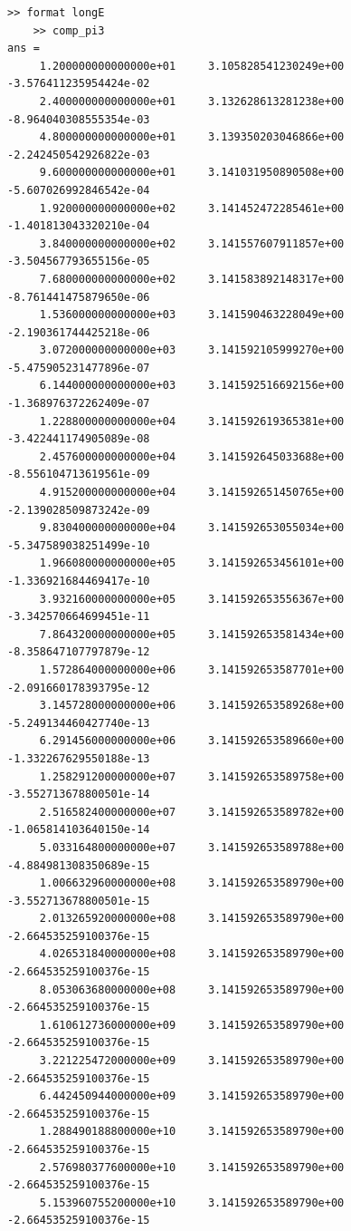 \documentclass[uplatex, dvipdfmx]{jsarticle}
\begin{document}
\begin{lstlisting}[caption=出力]
    >> format longE
    >> comp_pi3
ans =
     1.200000000000000e+01     3.105828541230249e+00    -3.576411235954424e-02
     2.400000000000000e+01     3.132628613281238e+00    -8.964040308555354e-03
     4.800000000000000e+01     3.139350203046866e+00    -2.242450542926822e-03
     9.600000000000000e+01     3.141031950890508e+00    -5.607026992846542e-04
     1.920000000000000e+02     3.141452472285461e+00    -1.401813043320210e-04
     3.840000000000000e+02     3.141557607911857e+00    -3.504567793655156e-05
     7.680000000000000e+02     3.141583892148317e+00    -8.761441475879650e-06
     1.536000000000000e+03     3.141590463228049e+00    -2.190361744425218e-06
     3.072000000000000e+03     3.141592105999270e+00    -5.475905231477896e-07
     6.144000000000000e+03     3.141592516692156e+00    -1.368976372262409e-07
     1.228800000000000e+04     3.141592619365381e+00    -3.422441174905089e-08
     2.457600000000000e+04     3.141592645033688e+00    -8.556104713619561e-09
     4.915200000000000e+04     3.141592651450765e+00    -2.139028509873242e-09
     9.830400000000000e+04     3.141592653055034e+00    -5.347589038251499e-10
     1.966080000000000e+05     3.141592653456101e+00    -1.336921684469417e-10
     3.932160000000000e+05     3.141592653556367e+00    -3.342570664699451e-11
     7.864320000000000e+05     3.141592653581434e+00    -8.358647107797879e-12
     1.572864000000000e+06     3.141592653587701e+00    -2.091660178393795e-12
     3.145728000000000e+06     3.141592653589268e+00    -5.249134460427740e-13
     6.291456000000000e+06     3.141592653589660e+00    -1.332267629550188e-13
     1.258291200000000e+07     3.141592653589758e+00    -3.552713678800501e-14
     2.516582400000000e+07     3.141592653589782e+00    -1.065814103640150e-14
     5.033164800000000e+07     3.141592653589788e+00    -4.884981308350689e-15
     1.006632960000000e+08     3.141592653589790e+00    -3.552713678800501e-15
     2.013265920000000e+08     3.141592653589790e+00    -2.664535259100376e-15
     4.026531840000000e+08     3.141592653589790e+00    -2.664535259100376e-15
     8.053063680000000e+08     3.141592653589790e+00    -2.664535259100376e-15
     1.610612736000000e+09     3.141592653589790e+00    -2.664535259100376e-15
     3.221225472000000e+09     3.141592653589790e+00    -2.664535259100376e-15
     6.442450944000000e+09     3.141592653589790e+00    -2.664535259100376e-15
     1.288490188800000e+10     3.141592653589790e+00    -2.664535259100376e-15
     2.576980377600000e+10     3.141592653589790e+00    -2.664535259100376e-15
     5.153960755200000e+10     3.141592653589790e+00    -2.664535259100376e-15
\end{lstlisting}
\end{document}
